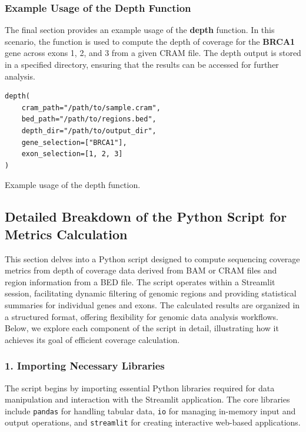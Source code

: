 \subsubsection{\textbf{Example Usage of the Depth Function}}

The final section provides an example usage of the \textbf{depth} function. In this scenario, the function is used to compute the depth of coverage for the \textbf{BRCA1} gene across exons 1, 2, and 3 from a given CRAM file. The depth output is stored in a specified directory, ensuring that the results can be accessed for further analysis.

\begin{longlisting}
\begin{verbatim}
depth(
    cram_path="/path/to/sample.cram", 
    bed_path="/path/to/regions.bed", 
    depth_dir="/path/to/output_dir", 
    gene_selection=["BRCA1"], 
    exon_selection=[1, 2, 3]
)
\end{verbatim}
\caption{Example usage of the depth function.}
\label{lbl:samtools6}
\end{longlisting}

\subsection{Detailed Breakdown of the Python Script for Metrics Calculation}

This section delves into a Python script designed to compute sequencing coverage metrics from depth of coverage data derived from BAM or CRAM files and region information from a BED file. The script operates within a Streamlit session, facilitating dynamic filtering of genomic regions and providing statistical summaries for individual genes and exons. The calculated results are organized in a structured format, offering flexibility for genomic data analysis workflows. Below, we explore each component of the script in detail, illustrating how it achieves its goal of efficient coverage calculation.

\subsubsection{1. Importing Necessary Libraries}

The script begins by importing essential Python libraries required for data manipulation and interaction with the Streamlit application. The core libraries include \texttt{pandas} for handling tabular data, \texttt{io} for managing in-memory input and output operations, and \texttt{streamlit} for creating interactive web-based applications.

